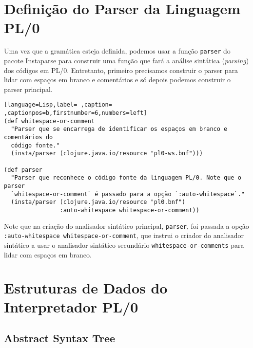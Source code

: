 \documentclass{scrartcl}
\begin{document}
\section{Definição do Parser da Linguagem PL/0}
\label{sec:org93b4fce}

Uma vez que a gramática esteja definida, podemos usar a função \texttt{parser} do
pacote Instaparse para construir uma função que fará a análise sintática
(\emph{parsing}) dos códigos em PL/0. Entretanto, primeiro precisamos construir o
parser para lidar com espaços em branco e comentários e só depois podemos
construir o parser principal.

\begin{lstlisting}[language=Lisp,label= ,caption= ,captionpos=b,firstnumber=6,numbers=left]
(def whitespace-or-comment
  "Parser que se encarrega de identificar os espaços em branco e comentários do
  código fonte."
  (insta/parser (clojure.java.io/resource "pl0-ws.bnf")))

(def parser
  "Parser que reconhece o código fonte da linguagem PL/0. Note que o parser
  `whitespace-or-comment` é passado para a opção `:auto-whitespace`."
  (insta/parser (clojure.java.io/resource "pl0.bnf")
                :auto-whitespace whitespace-or-comment))
\end{lstlisting}

Note que na criação do analisador sintático principal, \texttt{parser}, foi passada a
opção \texttt{:auto-whitespace whitespace-or-comment}, que instrui o criador do
analisador sintático a usar o analisador sintático secundário
\texttt{whitespace-or-comments} para lidar com espaços em branco.


\section{Estruturas de Dados do Interpretador PL/0}
\label{sec:orgcceb69d}

\subsection{Abstract Syntax Tree}
\label{sec:orgaa821b7}
\end{document}
